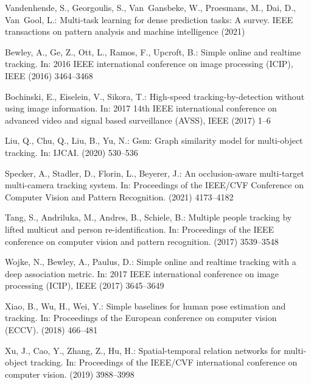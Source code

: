 \documentclass[runningheads]{llncs}
\begin{document}
\clearpage
\begin{thebibliography}{10}

Vandenhende, S., Georgoulis, S., Van~Gansbeke, W., Proesmans, M., Dai, D.,
  Van~Gool, L.:
\newblock Multi-task learning for dense prediction tasks: A survey.
\newblock IEEE transactions on pattern analysis and machine intelligence (2021)

Bewley, A., Ge, Z., Ott, L., Ramos, F., Upcroft, B.:
\newblock Simple online and realtime tracking.
\newblock In: 2016 IEEE international conference on image processing (ICIP),
  IEEE (2016)  3464--3468

Bochinski, E., Eiselein, V., Sikora, T.:
\newblock High-speed tracking-by-detection without using image information.
\newblock In: 2017 14th IEEE international conference on advanced video and
  signal based surveillance (AVSS), IEEE (2017)  1--6

Liu, Q., Chu, Q., Liu, B., Yu, N.:
\newblock Gsm: Graph similarity model for multi-object tracking.
\newblock In: IJCAI. (2020)  530--536

Specker, A., Stadler, D., Florin, L., Beyerer, J.:
\newblock An occlusion-aware multi-target multi-camera tracking system.
\newblock In: Proceedings of the IEEE/CVF Conference on Computer Vision and
  Pattern Recognition. (2021)  4173--4182

Tang, S., Andriluka, M., Andres, B., Schiele, B.:
\newblock Multiple people tracking by lifted multicut and person
  re-identification.
\newblock In: Proceedings of the IEEE conference on computer vision and pattern
  recognition. (2017)  3539--3548

Wojke, N., Bewley, A., Paulus, D.:
\newblock Simple online and realtime tracking with a deep association metric.
\newblock In: 2017 IEEE international conference on image processing (ICIP),
  IEEE (2017)  3645--3649

Xiao, B., Wu, H., Wei, Y.:
\newblock Simple baselines for human pose estimation and tracking.
\newblock In: Proceedings of the European conference on computer vision (ECCV).
  (2018)  466--481

Xu, J., Cao, Y., Zhang, Z., Hu, H.:
\newblock Spatial-temporal relation networks for multi-object tracking.
\newblock In: Proceedings of the IEEE/CVF international conference on computer
  vision. (2019)  3988--3998


\end{thebibliography}
\end{document}

